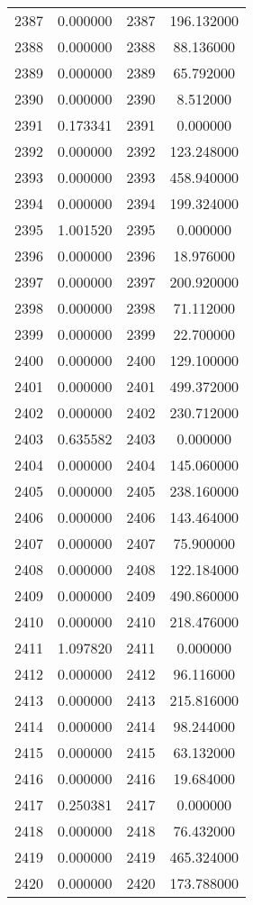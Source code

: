 \documentclass[12pt]{article}
\begin{document}
\begin{longtable}{@{}cccc@{}}
2387 & 0.000000 & 2387 & 196.132000 \\
2388 & 0.000000 & 2388 & 88.136000 \\
2389 & 0.000000 & 2389 & 65.792000 \\
2390 & 0.000000 & 2390 & 8.512000 \\
2391 & 0.173341 & 2391 & 0.000000 \\
2392 & 0.000000 & 2392 & 123.248000 \\
2393 & 0.000000 & 2393 & 458.940000 \\
2394 & 0.000000 & 2394 & 199.324000 \\
2395 & 1.001520 & 2395 & 0.000000 \\
2396 & 0.000000 & 2396 & 18.976000 \\
2397 & 0.000000 & 2397 & 200.920000 \\
2398 & 0.000000 & 2398 & 71.112000 \\
2399 & 0.000000 & 2399 & 22.700000 \\
2400 & 0.000000 & 2400 & 129.100000 \\
2401 & 0.000000 & 2401 & 499.372000 \\
2402 & 0.000000 & 2402 & 230.712000 \\
2403 & 0.635582 & 2403 & 0.000000 \\
2404 & 0.000000 & 2404 & 145.060000 \\
2405 & 0.000000 & 2405 & 238.160000 \\
2406 & 0.000000 & 2406 & 143.464000 \\
2407 & 0.000000 & 2407 & 75.900000 \\
2408 & 0.000000 & 2408 & 122.184000 \\
2409 & 0.000000 & 2409 & 490.860000 \\
2410 & 0.000000 & 2410 & 218.476000 \\
2411 & 1.097820 & 2411 & 0.000000 \\
2412 & 0.000000 & 2412 & 96.116000 \\
2413 & 0.000000 & 2413 & 215.816000 \\
2414 & 0.000000 & 2414 & 98.244000 \\
2415 & 0.000000 & 2415 & 63.132000 \\
2416 & 0.000000 & 2416 & 19.684000 \\
2417 & 0.250381 & 2417 & 0.000000 \\
2418 & 0.000000 & 2418 & 76.432000 \\
2419 & 0.000000 & 2419 & 465.324000 \\
2420 & 0.000000 & 2420 & 173.788000 \\

\end{longtable}
\end{document}
